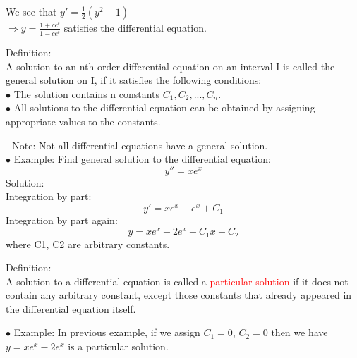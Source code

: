 \documentclass[12pt]{article}
\begin{document}
We see that $y' = \frac{1}{2} (y^2-1)$\\
$\Rightarrow y = \frac{1+ ce^t}{1- ce^t}$ satisfies the differential equation. 
\\
\begin{mybox}
    Definition:\\ A solution to an nth-order differential equation on an interval I is called the general solution on I, if it satisfies the following conditions:\\
    $\bullet$ The solution contains n constants $C_1, C_2, . . . , C_n.$\\
    $\bullet$ All solutions to the differential equation can be obtained by assigning appropriate values to the constants.
\end{mybox}
- Note: Not all differential equations have a general solution.
\\ 
$\bullet$ Example: Find general solution to the differential equation: 
$$y'' = xe^x $$
Solution:\\ 
Integration by part: \\
$$ y' = xe^x - e^x +C_1$$
Integration by part again: \\
$$y = xe^x - 2 e^x +C_1 x+ C_2$$
where C1, C2 are arbitrary constants.

\begin{mybox}
    Definition:\\ A solution to a differential equation is called a \textcolor{red}{particular solution} if it
does not contain any arbitrary constant, except those constants that
already appeared in the differential equation itself.

\end{mybox}
$\bullet$ Example: In previous example, if we assign $C_1 = 0$, $C_2 = 0$ then we have $y = xe^x - 2 e^x$ is a particular solution. \\
\end{document}
